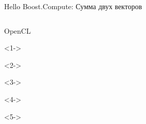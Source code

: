 \documentclass[@BEAMER_OPTIONS@]{beamer}
\begin{document}
\begin{frame}[fragile]{Hello Boost.Compute: Сумма двух векторов}
    \vspace{-1\baselineskip}
    \begin{columns}
        \begin{column}{0.2\textwidth}
            \begin{minipage}[c][\textheight][c]{\linewidth}
                \begin{exampleblock}{OpenCL}
                    \begin{adjustbox}{width=0.19\textwidth, height=\textheight, keepaspectratio}
                        \begin{minipage}{\textwidth}
                            \begin{uncoverenv}<1->
                                
                            \end{uncoverenv}
                            \begin{uncoverenv}<2->
                                
                            \end{uncoverenv}
                            \begin{uncoverenv}<3->
                                
                            \end{uncoverenv}
                            \begin{uncoverenv}<4->
                                
                            \end{uncoverenv}
                            \begin{uncoverenv}<5->
                                
                            \end{uncoverenv}
                        \end{minipage}
                    \end{adjustbox}
                \end{exampleblock}
            \end{minipage}
        \end{column}
        \begin{column}{0.7\textwidth}
            \begin{minipage}[c][\textheight][c]{\linewidth}

\end{minipage}
\end{column}
\end{columns}
\end{frame}
\end{document}
